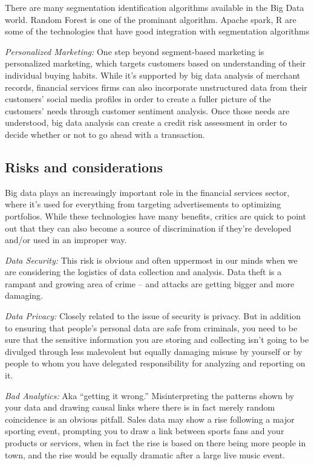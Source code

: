 \documentclass[sigconf]{acmart}
\begin{document}
There are many segmentation identification algorithms available in the Big Data world.  Random Forest is one of the prominant algorithm. Apache spark, R are some of the technologies that have good integration with segmentation algorithms

\textit{Personalized Marketing:} One step beyond segment-based marketing is personalized marketing, which targets customers based on understanding of their individual buying habits. While it’s  supported by big data analysis of merchant records, financial services firms can also incorporate unstructured data from their customers' social media profiles in order to create a fuller picture of the customers' needs through customer sentiment analysis. Once those needs are understood, big data analysis can create a credit risk assessment in order to decide whether or not to go ahead with a transaction.

\subsection{Risks and considerations}

Big data plays an increasingly important role in the financial services sector, where it’s used for everything from targeting advertisements to optimizing portfolios. While these technologies have many benefits, critics are quick to point out that they can also become a source of discrimination if they're developed and/or used in an improper way.

\textit{Data Security:} This risk is obvious and often uppermost in our minds when we are considering the logistics of data collection and analysis. Data theft is a rampant and growing area of crime – and attacks are getting bigger and more damaging. 

\textit{Data Privacy:} Closely related to the issue of security is privacy. But in addition to ensuring that people’s personal data are safe from criminals, you need to be sure that the sensitive information you are storing and collecting isn’t going to be divulged through less malevolent but equally damaging misuse by yourself or by people to whom you have delegated responsibility for analyzing and reporting on it.

\textit{Bad Analytics:} Aka “getting it wrong.” Misinterpreting the patterns shown by your data and drawing causal links where there is in fact merely random coincidence is an obvious pitfall. Sales data may show a rise following a major sporting event, prompting you to draw a link between sports fans and your products or services, when in fact the rise is based on there being more people in town, and the rise would be equally dramatic after a large live music event.
\end{document}
